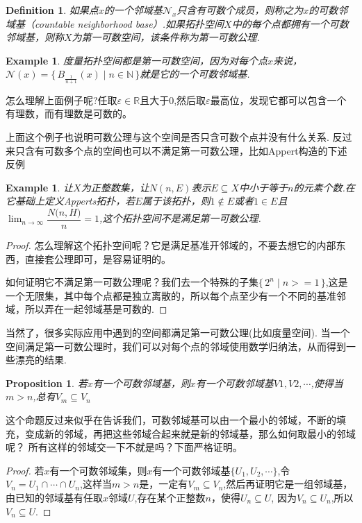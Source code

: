 \documentclass{article}
\newtheorem{proposition}[theorem]{Proposition}
\newtheorem{example}[theorem]{Example}
\newtheorem{definition}[theorem]{Definition}
\newcommand\Set[2]{\{\,#1\mid#2\,\}} %
\begin{document}
\begin{definition}
如果点$x$的一个邻域基$\mathcal{N}_x$只含有可数个成员，则称之为$x$的可数邻域基（countable neighborhood base）.如果拓扑空间$X$中的每个点都拥有一个可数邻域基，则称$X$为第一可数空间，该条件称为第一可数公理.
\end{definition}

\begin{example}
度量拓扑空间都是第一可数空间，因为对每个点$x$来说，$\mathcal{N}(x)=\Set{B_{\frac{1}{n+1}}(x)}{n\in \mathbb{N}}$就是它的一个可数邻域基.
\end{example}

怎么理解上面例子呢?任取$\varepsilon \in \mathbb{R}$且大于0,然后取$\varepsilon$最高位，发现它都可以包含一个有理数，而有理数是可数的。

上面这个例子也说明可数公理与这个空间是否只含可数个点并没有什么关系. 反过来只含有可数多个点的空间也可以不满足第一可数公理，比如Appert构造的下述反例

\begin{example}
让$X$为正整数集，让$N(n,E)$表示$E \subseteq X$中小于等于$n$的元素个数.在它基础上定义Apperts拓扑，若$E$属于该拓扑，则$1 \notin E$或者$1 \in E$且$\displaystyle \lim_{n \mathop \to \infty} \dfrac {{N}{(n, H}) } n = 1$,这个拓扑空间不是满足第一可数公理.
\end{example}

\begin{proof}
怎么理解这个拓扑空间呢？它是满足基准开邻域的，不要去想它的内部东西，直接套公理即可，是容易证明的。

如何证明它不满足第一可数公理呢？我们去一个特殊的子集$\Set{2^n}{n>=1}$,这是一个无限集，其中每个点都是独立离散的，所以每个点至少有一个不同的基准邻域，所以弄在一起邻域基是可数的.
\end{proof}

当然了，很多实际应用中遇到的空间都满足第一可数公理(比如度量空间). 当一个空间满足第一可数公理时，我们可以对每个点的邻域使用数学归纳法，从而得到一些漂亮的结果.

\begin{proposition}
若$x$有一个可数邻域基，则$x$有一个可数邻域基${V1,V2,\cdots}$,使得当$m > n$,总有$V_m \subseteq V_n$
\end{proposition}

这个命题反过来似乎在告诉我们，可数邻域基可以由一个最小的邻域，不断的填充，变成新的邻域，再把这些邻域合起来就是新的邻域基，那么如何取最小的邻域呢？ 所有这样的邻域交一下不就是吗？下面严格证明。

\begin{proof}
若$x$有一个可数邻域集，则$x$有一个可数邻域基$\{U_1,U_2,\cdots\}$,令$V_n=U_1 \cap \cdots \cap U_n$,这样当$m>n$是，一定有$V_m \subseteq V_n$,然后再证明它是一组邻域基，由已知的邻域基有任取$x$邻域$U$,存在某个正整数$n$，使得$U_n \subseteq U$, 因为$V_n \subseteq U_n$,所以$V_n \subseteq U$.
\end{proof}
\end{document}
